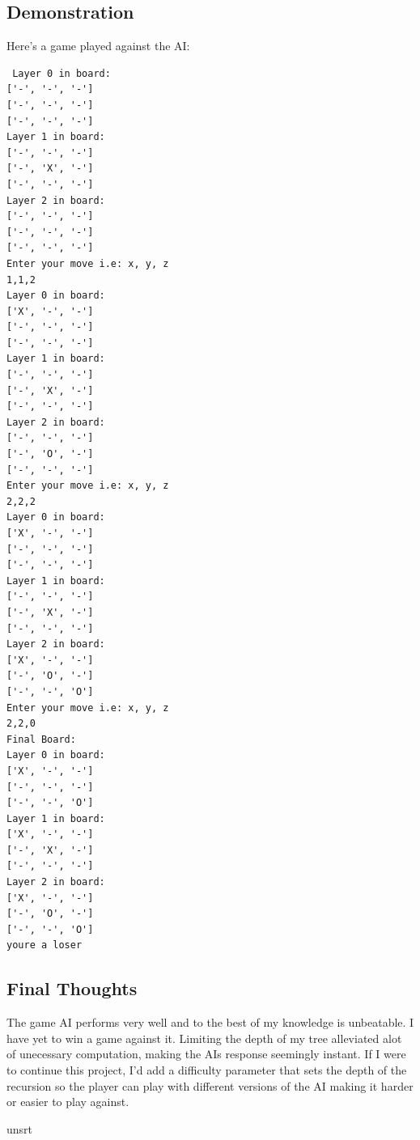 \documentclass[letterpaper]{article}
\begin{document}
\subsection {Demonstration}
Here's a game played against the AI:
\begin{lstlisting}
 Layer 0 in board:
['-', '-', '-']
['-', '-', '-']
['-', '-', '-']
Layer 1 in board:
['-', '-', '-']
['-', 'X', '-']
['-', '-', '-']
Layer 2 in board:
['-', '-', '-']
['-', '-', '-']
['-', '-', '-']
Enter your move i.e: x, y, z 
1,1,2
Layer 0 in board:
['X', '-', '-']
['-', '-', '-']
['-', '-', '-']
Layer 1 in board:
['-', '-', '-']
['-', 'X', '-']
['-', '-', '-']
Layer 2 in board:
['-', '-', '-']
['-', 'O', '-']
['-', '-', '-']
Enter your move i.e: x, y, z 
2,2,2
Layer 0 in board:
['X', '-', '-']
['-', '-', '-']
['-', '-', '-']
Layer 1 in board:
['-', '-', '-']
['-', 'X', '-']
['-', '-', '-']
Layer 2 in board:
['X', '-', '-']
['-', 'O', '-']
['-', '-', 'O']
Enter your move i.e: x, y, z
2,2,0
Final Board:
Layer 0 in board:
['X', '-', '-']
['-', '-', '-']
['-', '-', 'O']
Layer 1 in board:
['X', '-', '-']
['-', 'X', '-']
['-', '-', '-']
Layer 2 in board:
['X', '-', '-']
['-', 'O', '-']
['-', '-', 'O']
youre a loser
\end{lstlisting}

\subsection {Final Thoughts}
The game AI performs very well and to the best of my knowledge is unbeatable. I have yet to win a game against it. Limiting the depth of my tree alleviated alot of unecessary computation, making the AIs response seemingly instant. If I were to continue this project, I'd add a difficulty parameter that sets the depth of the recursion so the player can play with different versions of the AI making it harder or easier to play against.


 {unsrt}

\end{document}
